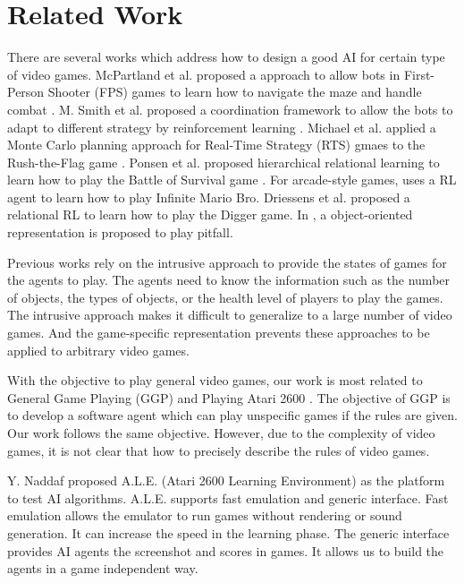 
\section{Related Work}

There are several works which address how to design a good AI for certain type of video games.
McPartland et al. proposed a approach to allow bots in First-Person Shooter (FPS)
games to learn how to navigate the maze and handle combat \cite{FPS}. M. Smith et al. proposed a coordination 
framework to allow the bots to adapt to different strategy by reinforcement learning \cite{FPS_TEAM}. 
Michael et al. applied a Monte Carlo planning approach for Real-Time Strategy (RTS) gmaes to 
the Rush-the-Flag game \cite{RTS}. Ponsen et al. proposed hierarchical relational learning to learn how to play
the Battle of Survival game \cite{HRRL}. For arcade-style games, \cite{Mario} uses a RL agent to learn
how to play Infinite Mario Bro. Driessens et al. proposed a relational RL to learn how to play the Digger
game. In \cite{OO}, a object-oriented representation is proposed to play pitfall.

Previous works rely on the intrusive approach to provide the states of games for the agents to play.
The agents need to know the information such as the number of objects, the types of objects,
or the health level of players to play the games. The intrusive approach makes it difficult to generalize
to a large number of video games. And the game-specific representation prevents these approaches
to be applied to arbitrary video games.

With the objective to play general video games, our work is most related to 
General Game Playing\cite{GGP} (GGP) and Playing Atari 2600 \cite{Yavar}. 
The objective of GGP is to develop a software agent which can play unspecific games if the rules
are given. Our work follows the same objective. However, due to the complexity of video games, 
it is not clear that how to precisely describe the rules of video games.

Y. Naddaf\cite{Yavar} proposed A.L.E. (Atari 2600 Learning Environment) as the platform to test AI algorithms.
A.L.E. supports fast emulation and generic interface. Fast emulation allows the emulator to run 
games without rendering or sound generation. It can increase the speed in the learning phase.
The generic interface provides AI agents the screenshot and scores in games. It allows us
to build the agents in a game independent way.

